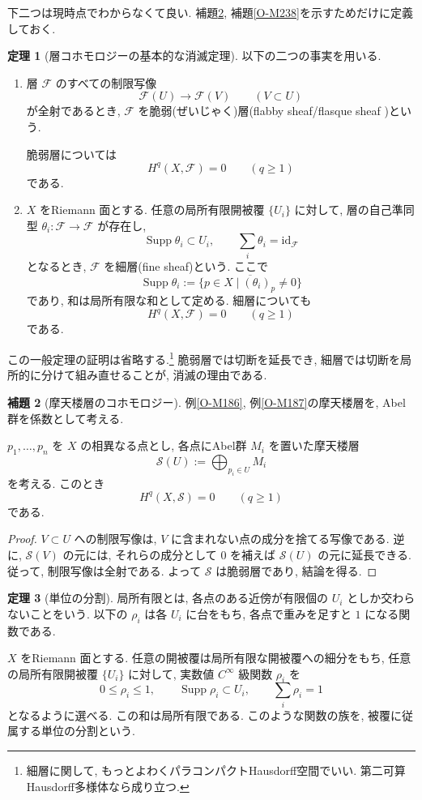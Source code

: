 \documentclass[dvipdfmx,a4paper,11pt]{article} %
\theoremstyle{definition}
\newtheorem{thm}{定理}[section]
\numberwithin{equation}{section}
\newtheorem{lem}[thm]{補題}
\begin{document}
下二つは現時点でわからなくて良い. 補題\ref{O-M237}, 補題\ref{O-M238}を示すためだけに定義しておく. 
\begin{thm}[層コホモロジーの基本的な消滅定理]\label{thm-flabby-fine-acyclic}
以下の二つの事実を用いる.
\begin{enumerate}
\item
層 $\mathcal F$ のすべての制限写像
\[
\mathcal F(U)\longrightarrow\mathcal F(V)
\qquad(V\subset U)
\]
が全射であるとき, $\mathcal F$ を脆弱(ぜいじゃく)層(flabby sheaf/flasque sheaf )という.

脆弱層については
\[
H^q(X,\mathcal F)=0\qquad(q\geq1)
\]
である.

\item
$X$ をRiemann 面とする.
任意の局所有限開被覆 $\{U_i\}$ に対して, 
層の自己準同型 $\theta_i:\mathcal F\to\mathcal F$ が存在し, 
\[
\operatorname{Supp}\theta_i\subset U_i,\qquad
\sum_i\theta_i=\mathrm{id}_{\mathcal F}
\]
となるとき, $\mathcal F$ を細層(fine sheaf)という.
ここで
\[
\operatorname{Supp}\theta_i
:=\overline{\{p\in X\mid(\theta_i)_p\neq0\}}
\]
であり, 和は局所有限な和として定める.
細層についても
\[
H^q(X,\mathcal F)=0\qquad(q\geq1)
\]
である.
\end{enumerate}
\end{thm}


この一般定理の証明は省略する.\footnote{細層に関して, もっとよわくパラコンパクトHausdorff空間でいい. 第二可算Hausdorff多様体なら成り立つ. }
脆弱層では切断を延長でき, 
細層では切断を局所的に分けて組み直せることが, 
消滅の理由である.

\begin{lem}[摩天楼層のコホモロジー]\label{O-M237}
例\ref{O-M186}, 例\ref{O-M187}の摩天楼層を, Abel群を係数として考える.

$p_1,\ldots,p_n$ を $X$ の相異なる点とし, 
各点にAbel群 $M_i$ を置いた摩天楼層
\[
\mathcal S(U):=\bigoplus_{p_i\in U}M_i
\]
を考える.
このとき
\[
H^q(X,\mathcal S)=0\qquad(q\geq1)
\]
である.
\end{lem}

\begin{proof}
$V\subset U$ への制限写像は, 
$V$ に含まれない点の成分を捨てる写像である.
逆に, $\mathcal S(V)$ の元には, それらの成分として
$0$ を補えば $\mathcal S(U)$ の元に延長できる.
従って, 制限写像は全射である.
よって $\mathcal S$ は脆弱層であり, 結論を得る.
\end{proof}

\begin{thm}[単位の分割]\label{O-M236}
局所有限とは, 各点のある近傍が有限個の $U_i$ としか交わらないことをいう. 以下の $\rho_i$ は各 $U_i$ に台をもち, 各点で重みを足すと $1$ になる関数である.

$X$ をRiemann 面とする.
任意の開被覆は局所有限な開被覆への細分をもち, 
任意の局所有限開被覆 $\{U_i\}$ に対して, 
実数値 $C^\infty$ 級関数 $\rho_i$ を
\[
0\leq\rho_i\leq1,\qquad
\operatorname{Supp}\rho_i\subset U_i,\qquad
\sum_i\rho_i=1
\]
となるように選べる.
この和は局所有限である.
このような関数の族を, 被覆に従属する単位の分割という.
\end{thm}
\end{document}
